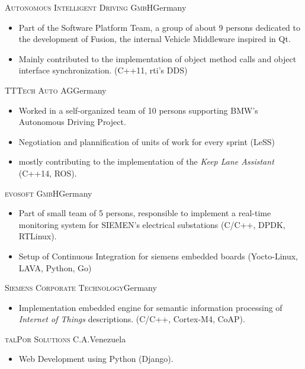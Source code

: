 \documentclass[10pt]{moderncv}
\begin{document}
{\textsc{Autonomous Intelligent Driving GmbH}}{Germany}{}{%
\begin{itemize}
  \item Part of the Software Platform Team, a group of about 9 persons dedicated to the development of Fusion, the internal
      Vehicle Middleware inspired in Qt.
  \item Mainly contributed to the implementation of object method calls and object interface synchronization. (C++11, rti's DDS)
\end{itemize}
}

{\textsc{TTTech Auto AG}}{Germany}{}{%
\begin{itemize}
  \item Worked in a self-organized team of 10 persons supporting BMW's Autonomous Driving Project.
  \item Negotiation and plannification of units of work for every sprint (LeSS)
  \item mostly contributing to the implementation of the \textit{Keep Lane Assistant} (C++14, ROS).
\end{itemize}
}

{\textsc{evosoft GmbH}}{Germany}{}{%
\begin{itemize}
  \item Part of small team of 5 persons, responsible to implement a real-time monitoring system for SIEMEN's electrical
      substations (C/C++, DPDK, RTLinux).
  \item Setup of Continuous Integration for siemens embedded boards (Yocto-Linux, LAVA, Python, Go)
\end{itemize}
}

{\textsc{Siemens Corporate Technology}}{Germany}{}{%
\begin{itemize}
  \item Implementation embedded engine for semantic information processing of \textit{Internet of Things} descriptions. (C/C++,
      Cortex-M4, CoAP).
\end{itemize}
}

{\textsc{talPor Solutions C.A.}}{Venezuela}{}{%
\begin{itemize}
  \item Web Development using Python (Django).
\end{itemize}
}
\end{document}
